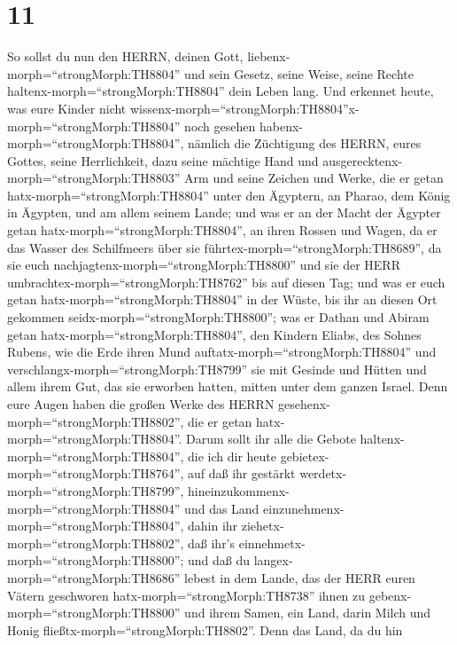 \hypertarget{section-10}{%
\section{11}\label{section-10}}

 So sollst du nun den HERRN, deinen Gott,
liebenx-morph=``strongMorph:TH8804'' und sein Gesetz, seine Weise, seine
Rechte haltenx-morph=``strongMorph:TH8804'' dein Leben lang.
 Und erkennet heute, was eure Kinder nicht
wissenx-morph=``strongMorph:TH8804''x-morph=``strongMorph:TH8804'' noch
gesehen habenx-morph=``strongMorph:TH8804'', nämlich die Züchtigung des
HERRN, eures Gottes, seine Herrlichkeit, dazu seine mächtige Hand und
ausgerecktenx-morph=``strongMorph:TH8803'' Arm  und seine
Zeichen und Werke, die er getan hatx-morph=``strongMorph:TH8804'' unter
den Ägyptern, an Pharao, dem König in Ägypten, und am allem seinem
Lande;  und was er an der Macht der Ägypter getan
hatx-morph=``strongMorph:TH8804'', an ihren Rossen und Wagen, da er das
Wasser des Schilfmeers über sie führtex-morph=``strongMorph:TH8689'', da
sie euch nachjagtenx-morph=``strongMorph:TH8800'' und sie der HERR
umbrachtex-morph=``strongMorph:TH8762'' bis auf diesen Tag; 
und was er euch getan hatx-morph=``strongMorph:TH8804'' in der Wüste,
bis ihr an diesen Ort gekommen seidx-morph=``strongMorph:TH8800'';
 was er Dathan und Abiram getan
hatx-morph=``strongMorph:TH8804'', den Kindern Eliabs, des Sohnes
Rubens, wie die Erde ihren Mund auftatx-morph=``strongMorph:TH8804'' und
verschlangx-morph=``strongMorph:TH8799'' sie mit Gesinde und Hütten und
allem ihrem Gut, das sie erworben hatten, mitten unter dem ganzen
Israel.  Denn eure Augen haben die großen Werke des HERRN
gesehenx-morph=``strongMorph:TH8802'', die er getan
hatx-morph=``strongMorph:TH8804''.  Darum sollt ihr alle die
Gebote haltenx-morph=``strongMorph:TH8804'', die ich dir heute
gebietex-morph=``strongMorph:TH8764'', auf daß ihr gestärkt
werdetx-morph=``strongMorph:TH8799'',
hineinzukommenx-morph=``strongMorph:TH8804'' und das Land
einzunehmenx-morph=``strongMorph:TH8804'', dahin ihr
ziehetx-morph=``strongMorph:TH8802'', daß ihr's
einnehmetx-morph=``strongMorph:TH8800'';  und daß du
langex-morph=``strongMorph:TH8686'' lebest in dem Lande, das der HERR
euren Vätern geschworen hatx-morph=``strongMorph:TH8738'' ihnen zu
gebenx-morph=``strongMorph:TH8800'' und ihrem Samen, ein Land, darin
Milch und Honig fließtx-morph=``strongMorph:TH8802''.  Denn
das Land, da du hin

